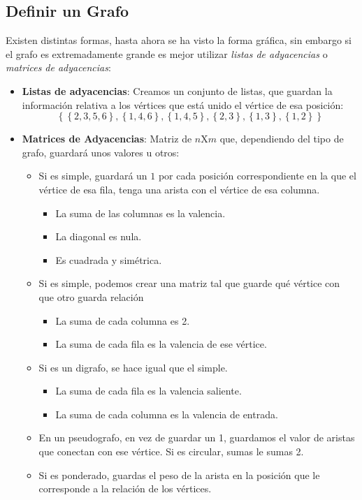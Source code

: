 \subsection{Definir un Grafo}
Existen distintas formas, hasta ahora se ha visto la forma gráfica, sin embargo si el grafo es extremadamente grande es mejor utilizar \textit{listas de adyacencias} o \textit{matrices de adyacencias}:
\begin{itemize}
        \item \textbf{Listas de adyacencias}: Creamos un conjunto de listas, que guardan la información relativa a los vértices que está unido el vértice de esa posición:\[
                      \left\{\left\{2,3,5,6\right\},\left\{1,4,6\right\} , \left\{1,4,5\right\} ,\left\{2,3\right\} , \left\{1,3\right\} , \left\{1,2\right\}\right\}
              \]
        \item \textbf{Matrices de Adyacencias}: Matriz de \(n\)X\(m\) que, dependiendo del tipo de grafo, guardará unos valores u otros:\begin{itemize}
                      \item Si es simple, guardará un \(1\) por cada posición correspondiente en la que el vértice de esa fila, tenga una arista con el vértice de esa columna. \begin{itemize}
                                    \item La suma de las columnas es la valencia.
                                    \item La diagonal es nula.
                                    \item Es cuadrada y simétrica.
                            \end{itemize}
                      \item Si es simple, podemos crear una matriz tal que guarde qué vértice con que otro guarda relación
                            \begin{itemize}
                                    \item La suma de cada columna es 2.
                                    \item La suma de cada fila es la valencia de ese vértice.
                            \end{itemize}
                      \item Si es un digrafo, se hace igual que el simple.\begin{itemize}
                                    \item La suma de cada fila es la valencia saliente.
                                    \item La suma de cada columna es la valencia de entrada.
                            \end{itemize}
                      \item En un pseudografo, en vez de guardar un 1, guardamos el valor de aristas que conectan con ese vértice. Si es circular, sumas le sumas 2.
                      \item Si es ponderado, guardas el peso de la arista en la posición que le corresponde a la relación de los vértices.
              \end{itemize}
\end{itemize}
